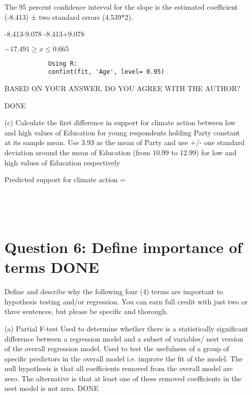 \documentclass[12pt,letterpaper]{article}
\begin{document}
\begin{enumerate}
		
		The 95
		percent confidence interval for the slope is the estimated coefficient (-8.413) ± two standard errors (4.539*2).
		
		-8.413-9.078
		-8.413+9.078
		
		$-17.491 \ge x \le 0.665$
		
		
		\begin{verbatim}
			Using R: 
			confint(fit, 'Age', level= 0.95)
		\end{verbatim}
		
		BASED ON YOUR ANSWER, DO YOU AGREE WITH THE AUTHOR?
		
		DONE
		
		\item [(c)] Calculate the first difference in support for climate action between low and high values
		of Education for young respondents holding Party constant at its sample mean. Use
		3.93 as the mean of Party and use +/- one standard deviation around the mean of
		Education (from 10.99 to 12.99) for low and high values of Education respectively
		
		
		Predicted support for climate action =  
		\begin{verbatim}
			
			
			
		\end{verbatim}
		\vspace{.5cm}
		\newpage
		\section*{Question 6: Define importance of terms DONE}
		Define and describe why the following four (4) terms are important to hypothesis testing
		and/or regression. You can earn full credit with just two or three sentences, but please be
		specific and thorough.
		
		\item [(a)] Partial F-test
		Used to determine whether there is a statistically significant difference between a regression model and a subset of variables/ nest version of the overall regression model. Used to test the usefulness of a group of specific predictors in the overall model i.e. improve the fit of the model.
		The null hypothesis is that all coefficients removed from the overall model are zero. The alternative is that at least one of these removed coefficients in the nest model is not zero. DONE
		
		\begin{verbatim}
		\end{verbatim}
		

\end{enumerate}
\end{document}
